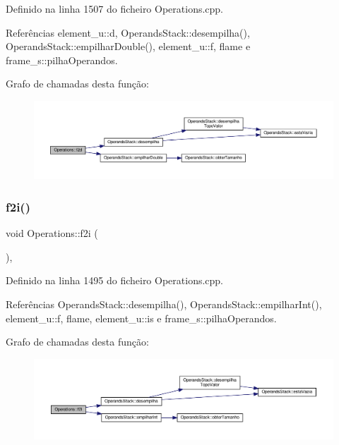 Definido na linha 1507 do ficheiro Operations.\+cpp.



Referências element\+\_\+u\+::d, Operands\+Stack\+::desempilha(), Operands\+Stack\+::empilhar\+Double(), element\+\_\+u\+::f, flame e frame\+\_\+s\+::pilha\+Operandos.

Grafo de chamadas desta função\+:
\nopagebreak
\begin{figure}[H]
\begin{center}
\leavevmode
\includegraphics[width=350pt]{classOperations_afb29ca09bc75d3342920b1509aba3635_cgraph}
\end{center}
\end{figure}
\mbox{\label{classOperations_adea8a32fb2ba183d0200ac22e1126fde}} 
\subsubsection{\texorpdfstring{f2i()}{f2i()}}
{\footnotesize\ttfamily void Operations\+::f2i (\begin{DoxyParamCaption}{ }\end{DoxyParamCaption})\hspace{0.3cm}{\ttfamily [static]}, {\ttfamily [private]}}



Definido na linha 1495 do ficheiro Operations.\+cpp.



Referências Operands\+Stack\+::desempilha(), Operands\+Stack\+::empilhar\+Int(), element\+\_\+u\+::f, flame, element\+\_\+u\+::is e frame\+\_\+s\+::pilha\+Operandos.

Grafo de chamadas desta função\+:
\nopagebreak
\begin{figure}[H]
\begin{center}
\leavevmode
\includegraphics[width=350pt]{classOperations_adea8a32fb2ba183d0200ac22e1126fde_cgraph}
\end{center}
\end{figure}
\mbox{\label{classOperations_a175cdab8d092bdd6c27bace9efbcd27e}} 
